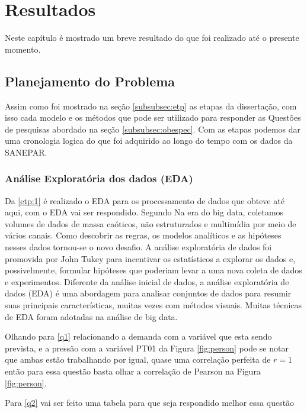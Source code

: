 \section{Resultados} \label{sec:result}
Neste capítulo é mostrado um breve resultado do que foi realizado até o presente momento.

\subsection{Planejamento do Problema} \label{subsec:planexp}

Assim como foi mostrado na seção \ref{subsubsec:etp} as etapas da dissertação, com isso cada modelo e os métodos que pode ser utilizado para responder as Questões de pesquisas abordado na seção \ref{subsubsec:obespec}. Com as etapas podemos dar uma cronologia logica do que foi adquirido ao longo do tempo com os dados da SANEPAR.

\subsubsection{An\'alise Explorat\'oria dos dados (EDA)}

Da \ref{etp:1} é realizado o EDA para os processamento de dados que obteve até aqui, com o EDA vai ser respondido. Segundo  Na era do big data, coletamos volumes de dados de massa caóticos, não estruturados e multimídia por meio de vários canais. Como descobrir as regras, os modelos analíticos e as hipóteses nesses dados tornou-se o novo desafio. A análise exploratória de dados foi promovida por John Tukey para incentivar os estatísticos a explorar os dados e, possivelmente, formular hipóteses que poderiam levar a uma nova coleta de dados e experimentos. Diferente da análise inicial de dados, a análise exploratória de dados (EDA) é uma abordagem para analisar conjuntos de dados para resumir suas principais características, muitas vezes com métodos visuais. Muitas técnicas de EDA foram adotadas na análise de big data.


Olhando para \ref{q1} relacionando a demanda com a variável que esta sendo prevista, e a pressão com a variável PT01 da Figura \ref{fig:person} pode se notar que ambas estão trabalhando por igual, quase uma correlação perfeita de $r=1$ então para essa questão basta olhar a correlação de Pearson na Figura \ref{fig:person}. 

Para \ref{q2} vai ser feito uma tabela para que seja respondido melhor essa questão

